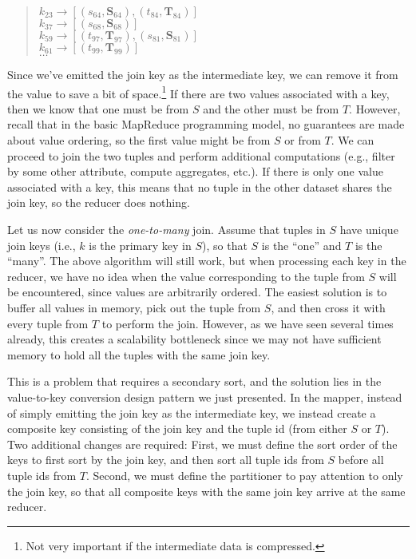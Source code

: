\begin{quote}
$k_{23} \rightarrow [ (s_{64}, \textbf{S}_{64}), (t_{84}, \textbf{T}_{84}) ]$ \\
$k_{37} \rightarrow [ (s_{68}, \textbf{S}_{68}) ]$ \\
$k_{59} \rightarrow [ (t_{97}, \textbf{T}_{97}), (s_{81}, \textbf{S}_{81}) ]$ \\
$k_{61} \rightarrow [ (t_{99}, \textbf{T}_{99}) ]$ \\
$\ldots$
\end{quote}

\noindent Since we've emitted the join key as the intermediate key, we
can remove it from the value to save a bit of space.\footnote{Not very
  important if the intermediate data is compressed.}  If there are two
values associated with a key, then we know that one must be from $S$
and the other must be from $T$.  However, recall that in the basic
MapReduce programming model, no guarantees are made about value
ordering, so the first value might be from $S$ or from $T$.  We can
proceed to join the two tuples and perform additional computations
(e.g., filter by some other attribute, compute aggregates, etc.).  If
there is only one value associated with a key, this means that no
tuple in the other dataset shares the join key, so the reducer does
nothing.

Let us now consider the \emph{one-to-many} join.  Assume that tuples in
$S$ have unique join keys (i.e., $k$ is the primary key in $S$), so
that $S$ is the ``one'' and $T$ is the ``many''.  The above algorithm
will still work, but when processing each key in the reducer, we have
no idea when the value corresponding to the tuple from $S$ will be
encountered, since values are arbitrarily ordered.  The easiest
solution is to buffer all values in memory, pick out the tuple from
$S$, and then cross it with every tuple from $T$ to perform the join.
However, as we have seen several times already, this creates a
scalability bottleneck since we may not have sufficient memory to hold
all the tuples with the same join key.

This is a problem that requires a secondary sort, and the solution
lies in the value-to-key conversion design pattern we just presented.
In the mapper, instead of simply emitting the join key as the
intermediate key, we instead create a composite key consisting of the
join key and the tuple id (from either $S$ or $T$).  Two additional
changes are required: First, we must define the sort order of the keys
to first sort by the join key, and then sort all tuple ids from $S$
before all tuple ids from $T$.  Second, we must define the
partitioner to pay attention to only the join key, so that all
composite keys with the same join key arrive at the same reducer.

